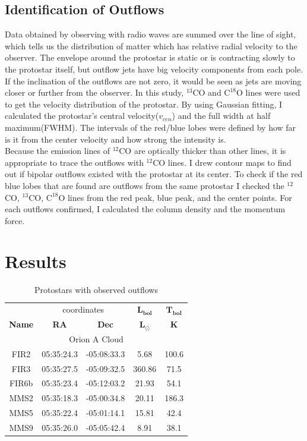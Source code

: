 \documentclass[twoside,11pt]{gshs_thesis}
\begin{document}
\subsection{Identification of Outflows}
Data obtained by observing with radio waves are summed over the line of sight, which tells us the distribution of matter which has relative radial velocity to the observer. The envelope around the protostar is static or is contracting slowly to the protostar itself, but outflow jets have big velocity components from each pole. If the inclination of the outflows are not zero, it would be seen as jets are moving closer or further from the observer. In this study, $^{13}$CO and $\textrm{C}^{18}\textrm{O}$ lines were used to get the velocity distribution of the protostar. By using Gaussian fitting, I calculated the protostar’s central velocity($v_{cen}$) and the full width at half maximum(FWHM). The intervals of the red/blue lobes were defined by how far is it from the center velocity and how strong the intensity is. \\
Because the emission lines of $^{12}$CO are optically thicker than other lines, it is appropriate to trace the outflows with $^{12}$CO lines. I drew contour maps to find out if bipolar outflows existed with the protostar at its center. To check if the red blue lobes that are found are outflows from the same protostar I checked the $^{12}$CO, $^{13}$CO, $\textrm{C}^{18}\textrm{O}$ lines from the red peak, blue peak, and the center points. For each outflows confirmed, I calculated the column density and the momentum force. \\

\newpage

\section{Results}

\begin{table}[h!]
	\begin{center}
		\begin{tabular}{c|c|c|c|c}
			\toprule
			& \multicolumn{2}{c|}{coordinates} & $\mathbf{L_{bol}}$ & $\mathbf{T_{bol}}$\\
			\textbf{Name} & \textbf{RA} & \textbf{Dec} & $\mathbf{L_{\odot}}$ & $\mathbf{K}$\\
			\midrule
			\multicolumn{5}{c}{Orion A Cloud}\\
			\midrule
			\centering
			FIR2 & 05:35:24.3 & -05:08:33.3 & 5.68 & 100.6\\
			FIR3 & 05:35:27.5 & -05:09:32.5 & 360.86 & 71.5\\
			FIR6b & 05:35:23.4 & -05:12:03.2 & 21.93 & 54.1\\
			MMS2 & 05:35:18.3 & -05:00:34.8 & 20.11 & 186.3\\
			MMS5 & 05:35:22.4 & -05:01:14.1 & 15.81 & 42.4\\
			MMS9 & 05:35:26.0 & -05:05:42.4 & 8.91 & 38.1\\
			\midrule
		\end{tabular}
	\end{center}
	\caption{Protostars with observed outflows}
\end{table}
\end{document}
